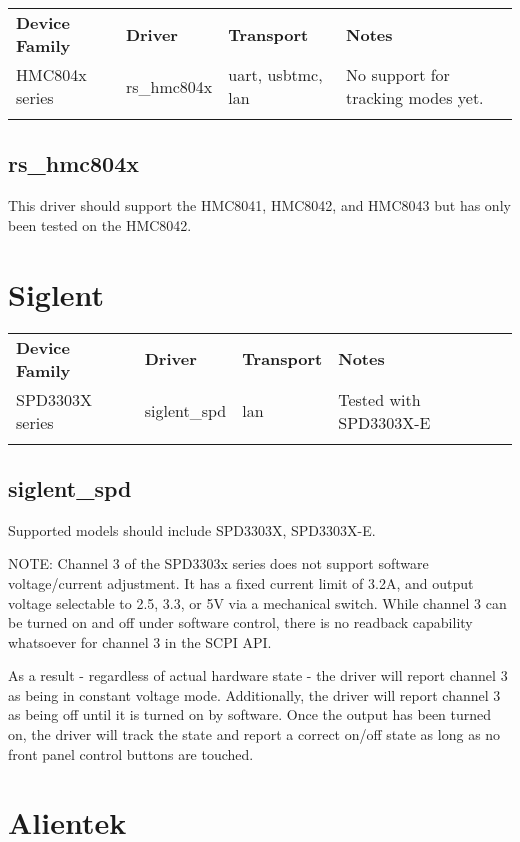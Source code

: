 \begin{tabularx}{16cm}{lllX}
\thickhline
\textbf{Device Family} & \textbf{Driver} & \textbf{Transport} & \textbf{Notes} \\
\thickhline
HMC804x series & rs\_hmc804x & uart, usbtmc, lan & No support for tracking modes yet.\\
\thickhline
\end{tabularx}

\subsection{rs\_hmc804x}

This driver should support the HMC8041, HMC8042, and HMC8043 but has only been tested on the HMC8042.

\section{Siglent}

\begin{tabularx}{16cm}{lllX}
\thickhline
\textbf{Device Family} & \textbf{Driver} & \textbf{Transport} & \textbf{Notes} \\
\thickhline
SPD3303X series & siglent\_spd & lan & Tested with SPD3303X-E\\
\thickhline
\end{tabularx}

\subsection{siglent\_spd}

Supported models should include SPD3303X, SPD3303X-E.

NOTE: Channel 3 of the SPD3303x series does not support software voltage/current adjustment. It has a fixed current
limit of 3.2A, and output voltage selectable to 2.5, 3.3, or 5V via a mechanical switch. While channel 3 can be turned
on and off under software control, there is no readback capability whatsoever for channel 3 in the SCPI API.

As a result - regardless of actual hardware state - the driver will report channel 3 as being in constant voltage mode.
Additionally, the driver will report channel 3 as being off until it is turned on by software. Once the output has been
turned on, the driver will track the state and report a correct on/off state as long as no front panel control buttons
are touched.

\section{Alientek}


